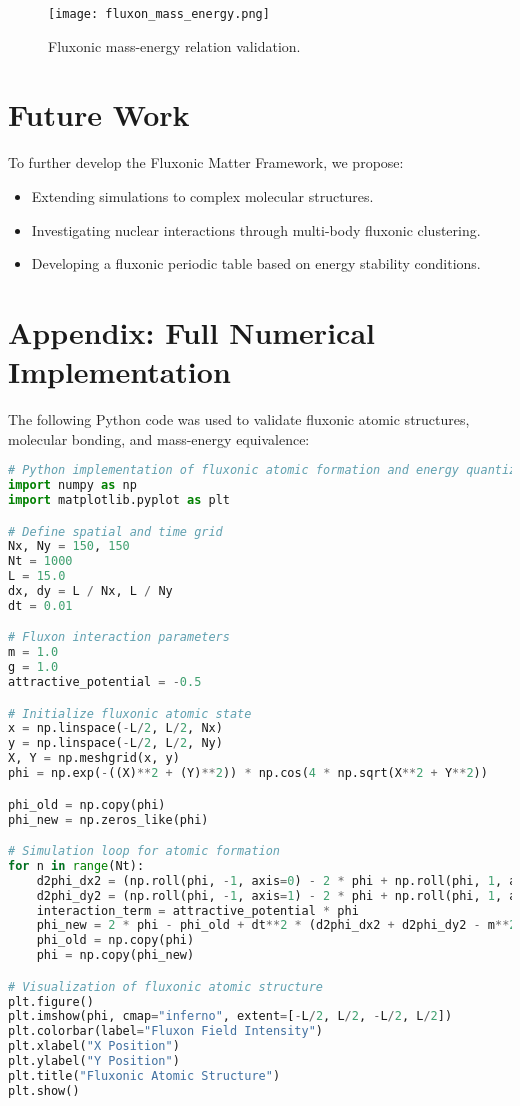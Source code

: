 \documentclass{article}
\begin{document}
\begin{figure}[h]
    \centering
    \texttt{[image: fluxon\_mass\_energy.png]}
    \caption{Fluxonic mass-energy relation validation.}
    \label{fig:massenergy}
\end{figure}

\section{Future Work}
To further develop the Fluxonic Matter Framework, we propose:
\begin{itemize}
    \item Extending simulations to complex molecular structures.
    \item Investigating nuclear interactions through multi-body fluxonic clustering.
    \item Developing a fluxonic periodic table based on energy stability conditions.
\end{itemize}

\section{Appendix: Full Numerical Implementation}
The following Python code was used to validate fluxonic atomic structures, molecular bonding, and mass-energy equivalence:

\begin{lstlisting}[language=Python, caption=Fluxonic Atomic Structure Simulation]
# Python implementation of fluxonic atomic formation and energy quantization.
import numpy as np
import matplotlib.pyplot as plt

# Define spatial and time grid
Nx, Ny = 150, 150
Nt = 1000
L = 15.0
dx, dy = L / Nx, L / Ny
dt = 0.01

# Fluxon interaction parameters
m = 1.0
g = 1.0
attractive_potential = -0.5

# Initialize fluxonic atomic state
x = np.linspace(-L/2, L/2, Nx)
y = np.linspace(-L/2, L/2, Ny)
X, Y = np.meshgrid(x, y)
phi = np.exp(-((X)**2 + (Y)**2)) * np.cos(4 * np.sqrt(X**2 + Y**2))

phi_old = np.copy(phi)
phi_new = np.zeros_like(phi)

# Simulation loop for atomic formation
for n in range(Nt):
    d2phi_dx2 = (np.roll(phi, -1, axis=0) - 2 * phi + np.roll(phi, 1, axis=0)) / dx**2
    d2phi_dy2 = (np.roll(phi, -1, axis=1) - 2 * phi + np.roll(phi, 1, axis=1)) / dy**2
    interaction_term = attractive_potential * phi
    phi_new = 2 * phi - phi_old + dt**2 * (d2phi_dx2 + d2phi_dy2 - m**2 * phi - g * phi**3 + interaction_term)
    phi_old = np.copy(phi)
    phi = np.copy(phi_new)

# Visualization of fluxonic atomic structure
plt.figure()
plt.imshow(phi, cmap="inferno", extent=[-L/2, L/2, -L/2, L/2])
plt.colorbar(label="Fluxon Field Intensity")
plt.xlabel("X Position")
plt.ylabel("Y Position")
plt.title("Fluxonic Atomic Structure")
plt.show()
\end{lstlisting}
\end{document}
